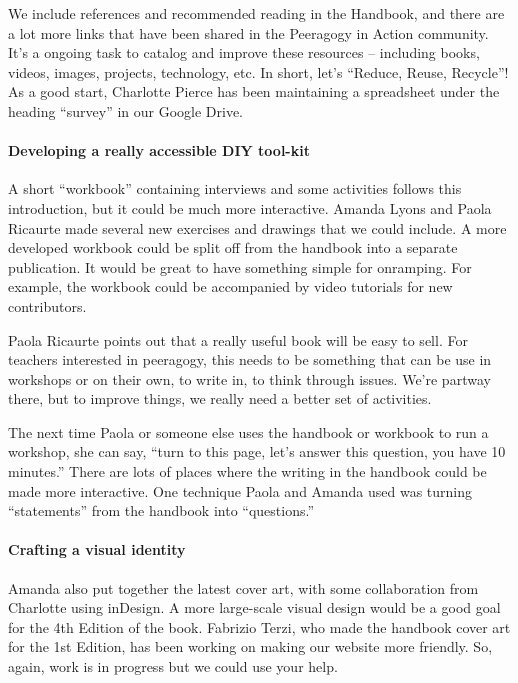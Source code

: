 We include references and recommended reading in the Handbook, and there
are a lot more links that have been shared in the Peeragogy in Action
community. It's a ongoing task to catalog and improve these resources --
including books, videos, images, projects, technology, etc. In short,
let's ``Reduce, Reuse, Recycle''! As a good start, Charlotte Pierce has
been maintaining a spreadsheet under the heading ``survey'' in our
Google Drive.

\hypertarget{developing-a-really-accessible-diy-tool-kit}{%
\paragraph{Developing a really accessible DIY
tool-kit}\label{developing-a-really-accessible-diy-tool-kit}}

A short ``workbook'' containing interviews and some activities follows
this introduction, but it could be much more interactive. Amanda Lyons
and Paola Ricaurte made several new exercises and drawings that we could
include. A more developed workbook could be split off from the handbook
into a separate publication. It would be great to have something simple
for onramping. For example, the workbook could be accompanied by video
tutorials for new contributors.

Paola Ricaurte points out that a really useful book will be easy to
sell. For teachers interested in peeragogy, this needs to be something
that can be use in workshops or on their own, to write in, to think
through issues. We're partway there, but to improve things, we really
need a better set of activities.

The next time Paola or someone else uses the handbook or workbook to run
a workshop, she can say, ``turn to this page, let's answer this
question, you have 10 minutes.'' There are lots of places where the
writing in the handbook could be made more interactive. One technique
Paola and Amanda used was turning ``statements'' from the handbook into
``questions.''

\hypertarget{crafting-a-visual-identity}{%
\paragraph{Crafting a visual
identity}\label{crafting-a-visual-identity}}

Amanda also put together the latest cover art, with some collaboration
from Charlotte using inDesign. A more large-scale visual design would be
a good goal for the 4th Edition of the book. Fabrizio Terzi, who made
the handbook cover art for the 1st Edition, has been working on making
our website more friendly. So, again, work is in progress but we could
use your help.

